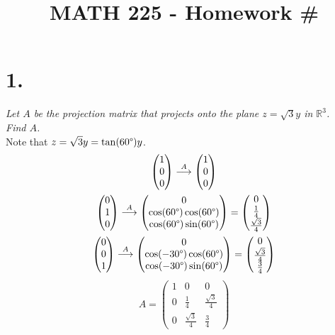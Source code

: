 \documentclass[12pt]{article}
\title{\vspace{-4\baselineskip}MATH 225 - Homework \#\HOMEWORKNUM}
\author{\NAME}
\date{\DATE}
\begin{document}
\maketitle

\section*{1.}
\textit{Let $A$ be the projection matrix that projects onto the plane
$z = \sqrt{3}y$ in $\mathbb{R}^3$. \\ Find $A$.}
\\[\baselineskip]
Note that $z = \sqrt{3}y = \tan(60 \degree)y$.
\begin{gather*}
	\begin{pmatrix} 1 \\ 0 \\ 0 \end{pmatrix}
	\overset{A}{\longrightarrow}
	\begin{pmatrix} 1 \\ 0 \\ 0 \end{pmatrix}
	\\
	\begin{pmatrix} 0 \\ 1 \\ 0 \end{pmatrix}
	\overset{A}{\longrightarrow}
	\begin{pmatrix}
		0 \\
		\cos(60 \degree) \cos(60 \degree) \\
		\cos(60 \degree) \sin(60 \degree)
	\end{pmatrix}
	=
	\begin{pmatrix}
		0 \\
		\frac{1}{4} \\
		\frac{\sqrt{3}}{4}
	\end{pmatrix}
	\\
	\begin{pmatrix} 0 \\ 0 \\ 1 \end{pmatrix}
	\overset{A}{\longrightarrow}
	\begin{pmatrix}
		0 \\
		\cos(-30 \degree) \cos(60 \degree) \\
		\cos(-30 \degree) \sin(60 \degree)
	\end{pmatrix}
	=
	\begin{pmatrix}
		0 \\
		\frac{\sqrt{3}}{4} \\
		\frac{3}{4}
	\end{pmatrix}
\end{gather*}
\begin{equation*}
	A =
	\boxed{
		\begin{pmatrix}
			1 & 0 & 0 \\
			0 & \frac{1}{4} & \frac{\sqrt{3}}{4} \\
			0 & \frac{\sqrt{3}}{4} & \frac{3}{4}
		\end{pmatrix}
	}
\end{equation*}
\newpage
\end{document}
